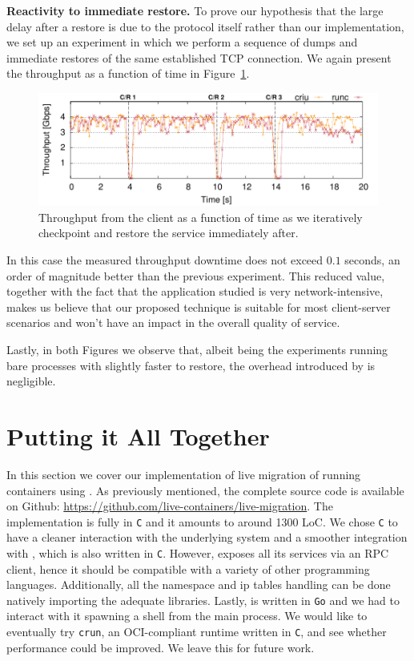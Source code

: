 \textbf{Reactivity to immediate restore.}
To prove our hypothesis that the large delay after a restore is due to the protocol itself rather than our implementation, we set up an experiment in which we perform a sequence of dumps and immediate restores of the same established TCP connection.
We again present the throughput as a function of time in Figure~\ref{fig:evaluation-reactivity}.
\begin{figure}[h!]
    \centering
    \includegraphics[width=\linewidth]{./figs/tcp-established-resolution/tcp_established_resolution_microbenchmark.pdf}
    \caption[Throughput over time and reactivity to sudden C/R.]{Throughput from the client as a function of time as we iteratively checkpoint and restore the service immediately after.\label{fig:evaluation-reactivity}}
\end{figure}
In this case the measured throughput downtime does not exceed $0.1$ seconds, an order of magnitude better than the previous experiment.
This reduced value, together with the fact that the application studied is very network-intensive, makes us believe that our proposed technique is suitable for most client-server scenarios and won't have an impact in the overall quality of service.

Lastly, in both Figures we observe that, albeit being the experiments running bare processes with \criu slightly faster to restore, the overhead introduced by \runc is negligible.

\section{Putting it All Together} \label{sec:system}

In this section we cover our implementation of live migration of running \runc containers using \criu.
As previously mentioned, the complete source code is available on Github: \url{https://github.com/live-containers/live-migration}.
The implementation is fully in \texttt{C} and it amounts to around 1300 LoC.
We chose \texttt{C} to have a cleaner interaction with the underlying system and a smoother integration with \criu, which is also written in \texttt{C}.
However, \criu exposes all its services via an RPC client, hence it should be compatible with a variety of other programming languages.
Additionally, all the namespace and ip tables handling can be done natively importing the adequate libraries.
Lastly, \runc is written in \texttt{Go} and we had to interact with it spawning a shell from the main process.
We would like to eventually try \texttt{crun}, an OCI-compliant runtime written in \texttt{C}, and see whether performance could be improved.
We leave this for future work.

